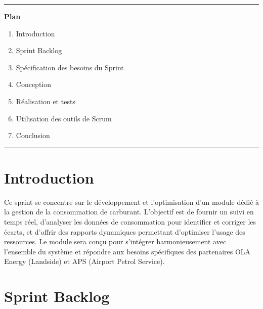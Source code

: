 \documentclass[a4paper,11pt]{report}
\begin{document}
\vspace{1.5cm}
\begin{center}
  \color{blue!60!black}\rule{0.6\textwidth}{1pt}
\end{center}
\vspace{1.5cm}

\begin{center}
  {\huge\bfseries Plan}\\[0.5em]
\end{center}
\vspace{1em}

\begin{enumerate}[%
  label=\bfseries\Large\arabic*., 
  leftmargin=2cm, 
  itemsep=1em
]
   \item Introduction
  \item Sprint Backlog
  \item Spécification des besoins du Sprint
  \item Conception
  \item Réalisation et tests
  \item Utilisation des outils de Scrum
  \item Conclusion
\end{enumerate}

\vfill
\begin{center}
  \color{blue!60!black}\rule{0.6\textwidth}{0.8pt}
\end{center}

\newpage
\setcounter{section}{0}

\section{Introduction}

Ce sprint se concentre sur le développement et l’optimisation d’un module dédié à la gestion de la consommation de carburant. L’objectif est de fournir un suivi en temps réel, d’analyser les données de consommation pour identifier et corriger les écarts, et d’offrir des rapports dynamiques permettant d’optimiser l’usage des ressources. Le module sera conçu pour s’intégrer harmonieusement avec l’ensemble du système et répondre aux besoins spécifiques des partenaires OLA Energy (Landside) et APS (Airport Petrol Service).

\section{Sprint Backlog}
\end{document}
